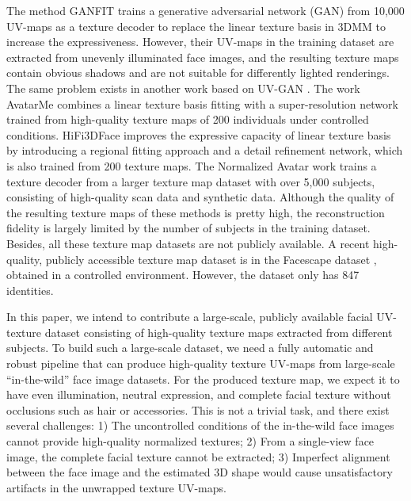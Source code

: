 \documentclass[10pt,twocolumn,letterpaper]{article}
\begin{document}
The method GANFIT \cite{gecer2019ganfit} trains a generative adversarial network (GAN) \cite{karras2017progressive} from 10,000 UV-maps as a texture decoder to replace the linear texture basis in 3DMM to increase the expressiveness.
However, their UV-maps in the training dataset are extracted from unevenly illuminated face images, and the resulting texture maps contain obvious shadows and are not suitable for differently lighted renderings. 
The same problem exists in another work \cite{lee2020uncertainty} based on UV-GAN \cite{deng2018uv}. 
The work AvatarMe \cite{lattas2020avatarme} combines a linear texture basis fitting with a super-resolution network trained from high-quality texture maps of 200 individuals under controlled conditions. 
HiFi3DFace \cite{bao2021high} improves the expressive capacity of linear texture basis by introducing a regional fitting approach and a detail refinement network, which is also trained from 200 texture maps. 
The Normalized Avatar work \cite{luo2021normalized} trains a texture decoder from a larger texture map dataset with over 5,000 subjects, consisting of high-quality scan data and synthetic data. 
Although the quality of the resulting texture maps of these methods is pretty high, the reconstruction fidelity is largely limited by the number of subjects in the training dataset. 
Besides, all these texture map datasets are not publicly available. 
A recent high-quality, publicly accessible texture map dataset is in the Facescape dataset \cite{yang2020facescape}, obtained in a controlled environment. However, the dataset only has 847 identities.


In this paper, we intend to contribute a large-scale, publicly available facial UV-texture dataset consisting of high-quality texture maps extracted from different subjects. 
To build such a large-scale dataset, we need a fully automatic and robust pipeline that can produce high-quality texture UV-maps from large-scale ``in-the-wild'' face image datasets. 
For the produced texture map, we expect it to have even illumination, neutral expression, and complete facial texture without occlusions such as hair or accessories.
This is not a trivial task, and there exist several challenges:
1) The uncontrolled conditions of the in-the-wild face images cannot provide high-quality normalized textures;
2) From a single-view face image, the complete facial texture cannot be extracted;
3) Imperfect alignment between the face image and the estimated 3D shape would cause unsatisfactory artifacts in the unwrapped texture UV-maps.
\end{document}
